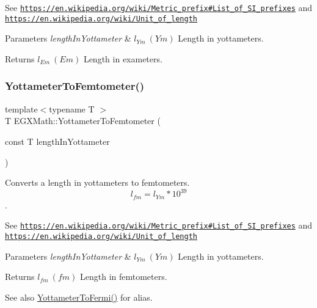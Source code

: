 See \href{https://en.wikipedia.org/wiki/Metric_prefix#List_of_SI_prefixes}{\tt https\+://en.\+wikipedia.\+org/wiki/\+Metric\+\_\+prefix\#\+List\+\_\+of\+\_\+\+S\+I\+\_\+prefixes} and \href{https://en.wikipedia.org/wiki/Unit_of_length}{\tt https\+://en.\+wikipedia.\+org/wiki/\+Unit\+\_\+of\+\_\+length} 
\begin{DoxyParams}{Parameters}
{\em length\+In\+Yottameter} & $ l_{Ym}\ (Ym)$ Length in yottameters. \\
\hline
\end{DoxyParams}
\begin{DoxyReturn}{Returns}
$ l_{Em}\ (Em)$ Length in exameters. 
\end{DoxyReturn}
\mbox{\label{group___e_g_x_math-_conversions-_length_conversions-_s_i-_yottameter-_s_i_ga02dbecce4d520a89139e6de0e2fec6d9}} 
\subsubsection{\texorpdfstring{Yottameter\+To\+Femtometer()}{YottameterToFemtometer()}}
{\footnotesize\ttfamily template$<$typename T $>$ \\
T E\+G\+X\+Math\+::\+Yottameter\+To\+Femtometer (\begin{DoxyParamCaption}\item[{const T}]{length\+In\+Yottameter }\end{DoxyParamCaption})}



Converts a length in yottameters to femtometers. \[ l_{fm}=l_{Ym} * 10^{39} \]. 

See \href{https://en.wikipedia.org/wiki/Metric_prefix#List_of_SI_prefixes}{\tt https\+://en.\+wikipedia.\+org/wiki/\+Metric\+\_\+prefix\#\+List\+\_\+of\+\_\+\+S\+I\+\_\+prefixes} and \href{https://en.wikipedia.org/wiki/Unit_of_length}{\tt https\+://en.\+wikipedia.\+org/wiki/\+Unit\+\_\+of\+\_\+length} 
\begin{DoxyParams}{Parameters}
{\em length\+In\+Yottameter} & $ l_{Ym}\ (Ym)$ Length in yottameters. \\
\hline
\end{DoxyParams}
\begin{DoxyReturn}{Returns}
$ l_{fm}\ (fm)$ Length in femtometers. 
\end{DoxyReturn}
\begin{DoxySeeAlso}{See also}
\mbox{\hyperlink{group___e_g_x_math-_conversions-_length_conversions-_s_i-_yottameter-_non-_s_i_gabf900c05975691fab8c5df7de16a467c}{Yottameter\+To\+Fermi()}} for alias. 
\end{DoxySeeAlso}
\mbox{\label{group___e_g_x_math-_conversions-_length_conversions-_s_i-_yottameter-_s_i_ga206834b7977e8b15c0fe06e279655c2b}} 
